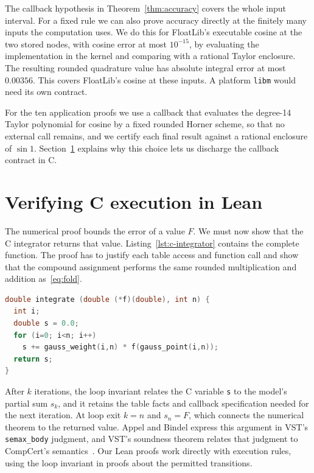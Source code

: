 \documentclass[11pt]{article}
\newcommand{\code}[1]{%
  \ifmmode\text{\texttt{\detokenize{#1}}}\else\nolinkurl{#1}\fi}
\begin{document}
The callback hypothesis in Theorem~\ref{thm:accuracy} covers the whole
input interval. For a fixed rule we can also prove accuracy directly at the
finitely many inputs the computation uses. We do this for FloatLib's
executable cosine at the two stored nodes, with cosine error at most
$10^{-15}$, by evaluating the implementation in the kernel and comparing
with a rational Taylor enclosure. The resulting rounded quadrature value
has absolute integral error at most $0.00356$. This covers FloatLib's
cosine at these inputs. A platform \code{libm} would need its own contract.

For the ten application proofs we use a callback that evaluates the
degree-14 Taylor polynomial for cosine by a fixed rounded Horner scheme, so
that no external call remains, and we certify each final result against a
rational enclosure of $\sin1$. Section~\ref{sec:programs} explains why this
choice lets us discharge the callback contract in C.

\section{Verifying C execution in Lean}
\label{sec:programs}

The numerical proof bounds the error of a value $F$. We must now show that
the C integrator returns that value. Listing~\ref{lst:c-integrator}
contains the complete function. The proof has to justify each table access
and function call and show that the compound assignment performs the same
rounded multiplication and addition as~\eqref{eq:fold}.

\begin{lstlisting}[language=C,float=htbp,
  caption={The original one-dimensional C integrator. The table accessors
  and callback are verified separately.},
  label={lst:c-integrator}]
double integrate (double (*f)(double), int n) {
  int i;
  double s = 0.0;
  for (i=0; i<n; i++)
    s += gauss_weight(i,n) * f(gauss_point(i,n));
  return s;
}
\end{lstlisting}

After $k$ iterations, the loop invariant relates the C variable \code{s} to
the model's partial sum $s_k$, and it retains the table facts and callback
specification needed for the next iteration. At loop exit $k=n$ and
$s_n=F$, which connects the numerical theorem to the returned value. Appel
and Bindel express this argument in VST's \code{semax_body} judgment,
and VST's soundness theorem relates that judgment to CompCert's
semantics~\cite{vst,vstfloyd}. Our Lean proofs work directly with execution
rules, using the loop invariant in proofs about the permitted transitions.
\end{document}

